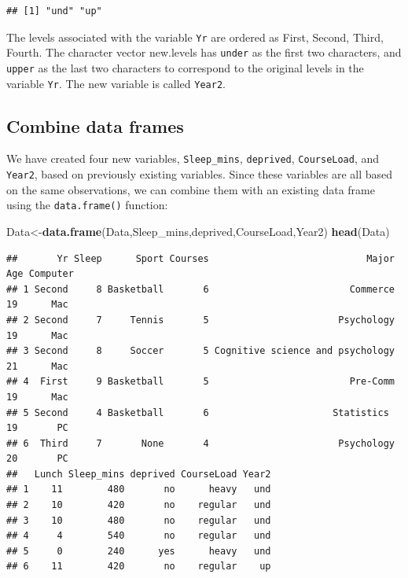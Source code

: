 \documentclass[
]{book}
\newenvironment{Shaded}{\begin{snugshade}}{\end{snugshade}}
\newcommand{\FunctionTok}[1]{\textcolor[rgb]{0.13,0.29,0.53}{\textbf{#1}}}
\newcommand{\NormalTok}[1]{#1}
\newcommand{\OtherTok}[1]{\textcolor[rgb]{0.56,0.35,0.01}{#1}}
\begin{document}
\begin{verbatim}
## [1] "und" "up"
\end{verbatim}

The levels associated with the variable \texttt{Yr} are ordered as First, Second, Third, Fourth. The character vector new.levels has \texttt{under} as the first two characters, and \texttt{upper} as the last two characters to correspond to the original levels in the variable \texttt{Yr}. The new variable is called \texttt{Year2}.

\hypertarget{combine-data-frames}{%
\subsection{Combine data frames}\label{combine-data-frames}}

We have created four new variables, \texttt{Sleep\_mins}, \texttt{deprived}, \texttt{CourseLoad}, and \texttt{Year2}, based on previously existing variables. Since these variables are all based on the same observations, we can combine them with an existing data frame using the \texttt{data.frame()} function:

\begin{Shaded}
\begin{Highlighting}[]
\NormalTok{Data}\OtherTok{\textless{}{-}}\FunctionTok{data.frame}\NormalTok{(Data,Sleep\_mins,deprived,CourseLoad,Year2)}
\FunctionTok{head}\NormalTok{(Data)}
\end{Highlighting}
\end{Shaded}

\begin{verbatim}
##       Yr Sleep      Sport Courses                            Major Age Computer
## 1 Second     8 Basketball       6                         Commerce  19      Mac
## 2 Second     7     Tennis       5                       Psychology  19      Mac
## 3 Second     8     Soccer       5 Cognitive science and psychology  21      Mac
## 4  First     9 Basketball       5                         Pre-Comm  19      Mac
## 5 Second     4 Basketball       6                      Statistics   19       PC
## 6  Third     7       None       4                       Psychology  20       PC
##   Lunch Sleep_mins deprived CourseLoad Year2
## 1    11        480       no      heavy   und
## 2    10        420       no    regular   und
## 3    10        480       no    regular   und
## 4     4        540       no    regular   und
## 5     0        240      yes      heavy   und
## 6    11        420       no    regular    up
\end{verbatim}
\end{document}
